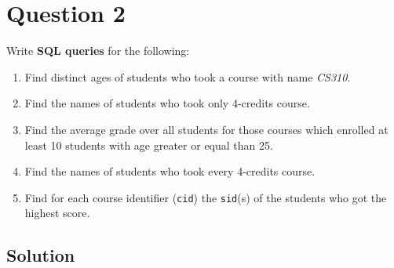 
\section*{Question 2}

Write \textbf{SQL queries} for the following:

\begin{enumerate}

\item
Find distinct ages of students who took a course with name \textit{CS310}.

\item
Find the names of students who took only 4-credits course.

\item
Find the average grade over all students for those courses which enrolled at least 10 students with age greater or equal than 25.

\item
Find the names of students who took every 4-credits course.

\item Find for each course identifier (\texttt{cid}) the \texttt{sid}(s) of the students who got the highest score.

\end{enumerate}

\subsection*{Solution}

\lstset{language=sql}

